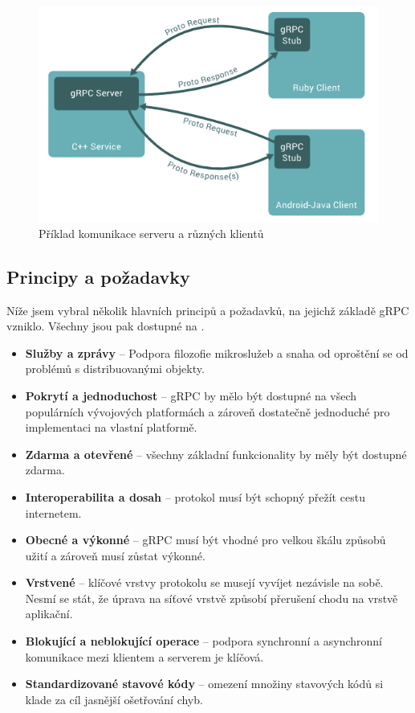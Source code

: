 \documentclass[thesis=M,czech]{FITthesis}[2019/12/23]
\begin{document}
\begin{figure}[H]
    \includegraphics[width=\linewidth]{img/grpc-overview.png}
    \caption{Příklad komunikace serveru a různých klientů \cite{grpc_image}}
	\label{grpc-overview}
\end{figure}

\subsection{Principy a požadavky}
Níže jsem vybral několik hlavních principů a požadavků, na jejichž základě gRPC vzniklo. Všechny jsou pak dostupné na \cite{grpc_requirements}.
\begin{itemize}
    \item \textbf{Služby a zprávy} -- Podpora filozofie mikroslužeb a snaha od oproštění se od problémů s distribuovanými objekty.
    \item \textbf{Pokrytí a jednoduchost} -- gRPC by mělo být dostupné na všech populárních vývojových platformách a zároveň dostatečně jednoduché pro implementaci na vlastní platformě.
    \item \textbf{Zdarma a otevřené} -- všechny základní funkcionality by měly být dostupné zdarma.
    \item \textbf{Interoperabilita a dosah} -- protokol musí být schopný přežít cestu internetem.
    \item \textbf{Obecné a výkonné} -- gRPC musí být vhodné pro velkou škálu způsobů užití a zároveň musí zůstat výkonné.
    \item \textbf{Vrstvené} -- klíčové vrstvy protokolu se musejí vyvíjet nezávisle na sobě. Nesmí se stát, že úprava na síťové vrstvě způsobí přerušení chodu na vrstvě aplikační.
    \item \textbf{Blokující a neblokující operace} -- podpora synchronní a asynchronní komunikace mezi klientem a serverem je klíčová.
    \item \textbf{Standardizované stavové kódy} -- omezení množiny stavových kódů si klade za cíl jasnější ošetřování chyb.
\end{itemize}
\end{document}
